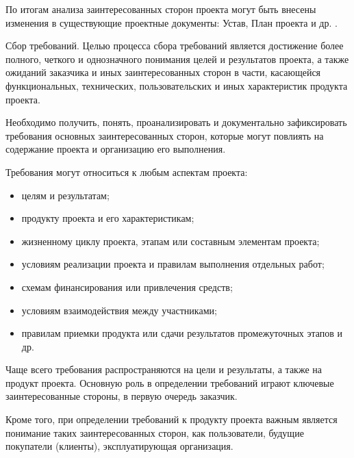 По итогам анализа заинтересованных сторон проекта могут быть внесены изменения в существующие проектные документы: Устав,
План проекта и др. \cite[141--143]{polkovnikov}.

Сбор требований.
Целью процесса сбора требований является достижение более пол­ного, четкого и однозначного понимания целей и результатов проекта, а также ожиданий заказчика и иных заинтересованных сторон в ча­сти, касающейся функциональных, технических, пользовательских и иных характеристик продукта проекта.

Необходимо получить, понять, проанализировать и документаль­но зафиксировать требования основных заинтересованных сторон, которые могут повлиять на содержание проекта и организацию его выполнения.

Требования могут относиться к любым аспектам проекта:
\begin{itemize}
	\item целям и результатам;
	\item продукту проекта и его характеристикам;
	\item жизненному циклу проекта, этапам или составным элементам проекта;
	\item условиям реализации проекта и правилам выполнения отдельных работ;
	\item схемам финансирования или привлечения средств;
	\item условиям взаимодействия между участниками;
	\item правилам приемки продукта или сдачи результатов промежуточ­ных этапов и др.
\end{itemize}

Чаще всего требования распространяются на цели и результаты, а также на продукт проекта.
Основную роль в определении требова­ний играют ключевые заинтересованные стороны, в первую очередь заказчик.

Кроме того, при определении требований к продукту проекта важ­ным является понимание таких заинтересованных сторон, как поль­зователи, будущие покупатели (клиенты), эксплуатирующая орга­низация.
















